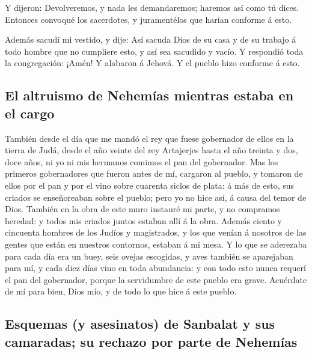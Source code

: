  Y dijeron: Devolveremos, y nada les demandaremos;
haremos así como tú dices. Entonces convoqué los sacerdotes, y
juramentélos que harían conforme á esto.

 Además sacudí mi vestido, y dije: Así sacuda Dios de su
casa y de su trabajo á todo hombre que no cumpliere esto, y así sea
sacudido y vacío. Y respondió toda la congregación: ¡Amén! Y alabaron á
Jehová. Y el pueblo hizo conforme á esto.

\hypertarget{el-altruismo-de-nehemuxedas-mientras-estaba-en-el-cargo}{%
\subsection{El altruismo de Nehemías mientras estaba en el
cargo}\label{el-altruismo-de-nehemuxedas-mientras-estaba-en-el-cargo}}

 También desde el día que me mandó el rey que fuese
gobernador de ellos en la tierra de Judá, desde el año veinte del rey
Artajerjes hasta el año treinta y dos, doce años, ni yo ni mis hermanos
comimos el pan del gobernador.  Mas los primeros
gobernadores que fueron antes de mí, cargaron al pueblo, y tomaron de
ellos por el pan y por el vino sobre cuarenta siclos de plata: á más de
esto, sus criados se enseñoreaban sobre el pueblo; pero yo no hice así,
á causa del temor de Dios.  También en la obra de este
muro instauré mi parte, y no compramos heredad: y todos mis criados
juntos estaban allí á la obra.  Además ciento y cincuenta
hombres de los Judíos y magistrados, y los que venían á nosotros de las
gentes que están en nuestros contornos, estaban á mi mesa.
 Y lo que se aderezaba para cada día era un buey, seis
ovejas escogidas, y aves también se aparejaban para mí, y cada diez días
vino en toda abundancia: y con todo esto nunca requerí el pan del
gobernador, porque la servidumbre de este pueblo era grave.
 Acuérdate de mí para bien, Dios mío, y de todo lo que
hice á este pueblo.

\hypertarget{esquemas-y-asesinatos-de-sanbalat-y-sus-camaradas-su-rechazo-por-parte-de-nehemuxedas}{%
\subsection{Esquemas (y asesinatos) de Sanbalat y sus camaradas; su
rechazo por parte de
Nehemías}\label{esquemas-y-asesinatos-de-sanbalat-y-sus-camaradas-su-rechazo-por-parte-de-nehemuxedas}}

